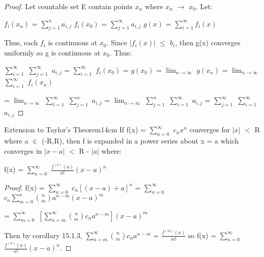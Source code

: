     \begin{proof}
        Let countable set E contain points $x_n$ where $x_n$ $\rightarrow$ $x_0$.
        Let:
        
        \hspace{0.5cm}
        $f_i(x_n)$ = $\sum_{j=1}^{n} a_{i,j}$
        \hspace{1cm}
        $f_i(x_0)$ = $\sum_{j=1}^{\infty} a_{i,j}$
        \hspace{1cm}
        $g(x)$ = $\sum_{i=1}^{\infty} f_i(x)$

        Thus, each $f_i$ is continuous at $x_0$.
        Since $|f_i(x)|$ $\leq$ $b_i$, then g(x) converges uniformly
        so g is continuous at $x_0$. Thus:

        \hspace{0.5cm}
        $\sum_{i=1}^{\infty}$ $\sum_{j=1}^{\infty}$ $a_{i,j}$
        = $\sum_{i=1}^{\infty}$ $f_i(x_0)$ = $g(x_0)$
        = $\lim_{n \rightarrow \infty}$ $g(x_n)$
        = $\lim_{n \rightarrow \infty}$ $\sum_{i=1}^{\infty}$ $f_i(x_n)$

        \hspace{0.5cm}
        = $\lim_{n \rightarrow \infty}$ $\sum_{i=1}^{\infty}$
            $\sum_{j=1}^{n}$ $a_{i,j}$
        = $\lim_{n \rightarrow \infty}$ $\sum_{j=1}^{n}$
            $\sum_{i=1}^{\infty}$ $a_{i,j}$
        = $\sum_{j=1}^{\infty}$ $\sum_{i=1}^{\infty}$ $a_{i,j}$
    \end{proof}

    \vspace{0.5cm}



    \begin{wtheorem}{Extension to Taylor's Theorem}{14cm}
        If f(x) = $\sum_{n=0}^{\infty}$ $c_nx^n$ converges for $|x|$ $<$ R
        where a $\in$ (-R,R), then f is expanded in a power series about x = a
        which converges in $|x-a|$ $<$ R - $|a|$ where:

        \hspace{0.5cm}
        f(x) = $\sum_{n=0}^{\infty}$ $\frac{f^{(n)}(a)}{n!}(x-a)^n$
    \end{wtheorem}

    \begin{proof}
        f(x)
        = $\sum_{n=0}^{\infty}$ $c_n[(x-a)+a]^n$
        = $\sum_{n=0}^{\infty}$ $c_n \sum_{m=0}^n \binom{n}{m} a^{n-m} (x-a)^m$

        \hspace{0.7cm}
        = $\sum_{m=0}^{\infty}$
            $[\sum_{n=m}^{\infty} \binom{n}{m} c_n a^{n-m}] (x-a)^m$ 

        Then by {\color{orange} corollary 15.1.3},
        $\sum_{n=m}^{\infty} \binom{n}{m} c_n a^{n-m}$
        = $\frac{f^{(m)}(a)}{m!}$
        so f(x) = $\sum_{n=0}^{\infty}$ $\frac{f^{(n)}(a)}{n!}(x-a)^n$.
    \end{proof}

